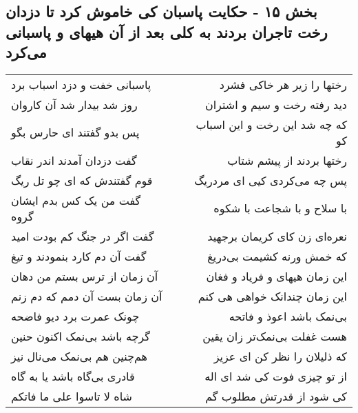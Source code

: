 \begin{center}
\section*{بخش ۱۵ - حکایت پاسبان کی خاموش کرد تا دزدان رخت تاجران بردند به کلی بعد از آن هیهای و پاسبانی می‌کرد}
\label{sec:sh015}
\begin{longtable}{l p{0.5cm} r}
پاسبانی خفت و دزد اسباب برد
&&
رختها را زیر هر خاکی فشرد
\\
روز شد بیدار شد آن کاروان
&&
دید رفته رخت و سیم و اشتران
\\
پس بدو گفتند ای حارس بگو
&&
که چه شد این رخت و این اسباب کو
\\
گفت دزدان آمدند اندر نقاب
&&
رختها بردند از پیشم شتاب
\\
قوم گفتندش که ای چو تل ریگ
&&
پس چه می‌کردی کیی ای مردریگ
\\
گفت من یک کس بدم ایشان گروه
&&
با سلاح و با شجاعت با شکوه
\\
گفت اگر در جنگ کم بودت امید
&&
نعره‌ای زن کای کریمان برجهید
\\
گفت آن دم کارد بنمودند و تیغ
&&
که خمش ورنه کشیمت بی‌دریغ
\\
آن زمان از ترس بستم من دهان
&&
این زمان هیهای و فریاد و فغان
\\
آن زمان بست آن دمم که دم زنم
&&
این زمان چندانک خواهی هی کنم
\\
چونک عمرت برد دیو فاضحه
&&
بی‌نمک باشد اعوذ و فاتحه
\\
گرچه باشد بی‌نمک اکنون حنین
&&
هست غفلت بی‌نمک‌تر زان یقین
\\
هم‌چنین هم بی‌نمک می‌نال نیز
&&
که ذلیلان را نظر کن ای عزیز
\\
قادری بی‌گاه باشد یا به گاه
&&
از تو چیزی فوت کی شد ای اله
\\
شاه لا تاسوا علی ما فاتکم
&&
کی شود از قدرتش مطلوب گم
\\
\end{longtable}
\end{center}
